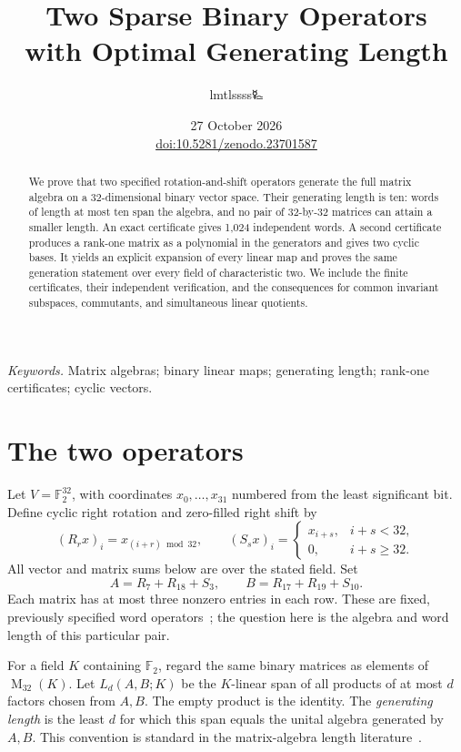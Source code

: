 \documentclass[11pt,a4paper]{article}
\title{\LARGE Two Sparse Binary Operators\\with Optimal Generating Length}
\author{lmtlssss{\authorsymbol 🜐}}
\date{27 October 2026\\[3pt]{\small\href{https://doi.org/10.5281/zenodo.23701587}{doi:10.5281/zenodo.23701587}}}
\theoremstyle{definition}\newtheorem{definition}[theorem]{Definition}
\newcommand{\F}{\mathbb F_2}
\newcommand{\Mat}{\operatorname{M}}
\begin{document}
\maketitle\thispagestyle{plain}
\begin{abstract}
We prove that two specified rotation-and-shift operators generate the full
matrix algebra on a 32-dimensional binary vector space. Their generating
length is ten: words of length at most ten span the algebra, and no pair of
32-by-32 matrices can attain a smaller length. An exact certificate gives
1,024 independent words. A second certificate produces a rank-one matrix
as a polynomial in the generators and gives two cyclic bases. It yields
an explicit expansion of every linear map and proves the same generation
statement over every field of characteristic two. We include the finite
certificates, their independent verification, and the consequences for
common invariant subspaces, commutants, and simultaneous linear quotients.
\end{abstract}
\noindent\textit{Keywords.} Matrix algebras; binary linear maps; generating
length; rank-one certificates; cyclic vectors.

\section{The two operators}
Let $V=\F^{32}$, with coordinates $x_0,\ldots,x_{31}$ numbered from the
least significant bit. Define cyclic right rotation and zero-filled right
shift by
\begin{equation}\label{eq:shifts}
 (R_rx)_i=x_{(i+r)\bmod32},\qquad
 (S_sx)_i=\begin{cases}x_{i+s},&i+s<32,\\0,&i+s\geq32.\end{cases}
\end{equation}
All vector and matrix sums below are over the stated field. Set
\begin{equation}\label{eq:operators}
 A=R_7+R_{18}+S_3,\qquad B=R_{17}+R_{19}+S_{10}.
\end{equation}
Each matrix has at most three nonzero entries in each row. These are fixed,
previously specified word operators~\cite[Section~5.1]{rfc6234}; the question
here is the algebra and word length of this particular pair.

For a field $K$ containing $\F$, regard the same binary matrices as elements
of $\Mat_{32}(K)$. Let $L_d(A,B;K)$ be the $K$-linear span of all products
of at most $d$ factors chosen from $A,B$. The empty product is the identity.
The \emph{generating length} is the least $d$ for which this span equals the
unital algebra generated by $A,B$. This convention is standard in the
matrix-algebra length literature~\cite{laffey,klep}.
\end{document}
